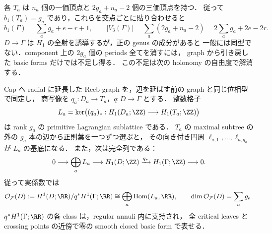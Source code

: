 各 $T_a$ は $n_a$ 個の一価頂点と $2g_a+n_a-2$ 個の三価頂点を持つ．
従って $b_1(T_a)=g_a$ であり，これらを交点ごとに貼り合わせると
\begin{equation}\label{snc:graph-counts}
 b_1(\Gamma)=\sum_a g_a+e-r+1,\qquad
 |V_3(\Gamma)|=\sum_a(2g_a+n_a-2)=2\sum_a g_a+2e-2r.
\end{equation}
$D\to\Gamma$ は $H_1$ の全射を誘導するが，正の genus の成分があると
一般には同型でない．component 上の $2g_a$ 個の periods 全てを消すには，
graph から引き戻した basic forms だけでは不足し得る．
この不足は次の holonomy の自由度で解消する．

\begin{lemma}
\label{snc:reeb-leaf-kernel}
Cap へ radial に延長した Reeb graph を，辺を延ばす前の graph と同じ位相型で同定し，
商写像を $q_a:D_a\to T_a$，$q:D\to\Gamma$ とする．
整数格子
\[
 L_a=\ker\bigl((q_a)_*:H_1(D_a;\ZZ)\longrightarrow H_1(T_a;\ZZ)\bigr)
\]
は rank $g_a$ の primitive Lagrangian sublattice である．
$T_a$ の maximal subtree の外の $g_a$ 本の辺から正則葉を一つずつ選ぶと，
その向き付き円周 $\ell_{a,1},\ldots,\ell_{a,g_a}$ が $L_a$ の基底になる．
また，次は完全列である：
\begin{equation}\label{snc:reeb-homology-sequence}
 0\longrightarrow\bigoplus_aL_a\longrightarrow H_1(D;\ZZ)
 \xrightarrow{q_*}H_1(\Gamma;\ZZ)\longrightarrow0.
\end{equation}
従って実係数では
\begin{equation}\label{snc:leaf-obstruction-space}
 \mathcal O_{\mathcal F}(D):=
 H^1(D;\RR)/q^*H^1(\Gamma;\RR)
 \cong\bigoplus_a\operatorname{Hom}(L_a,\RR),
 \qquad \dim\mathcal O_{\mathcal F}(D)=\sum_a g_a.
\end{equation}
$q^*H^1(\Gamma;\RR)$ の各 class は，regular annuli 内に支持され，
全 critical leaves と crossing points の近傍で零の smooth closed basic form で表せる．
\end{lemma}

